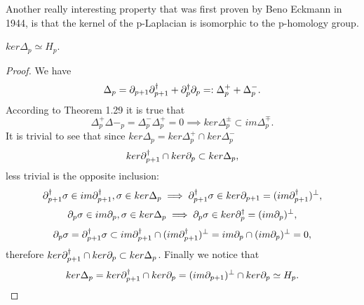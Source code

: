 \documentclass[../1.tex]{subfiles}
\begin{document}
    Another really interesting property that was first proven by Beno Eckmann in 1944, is that the kernel of the p-Laplacian
    is isomorphic to the p-homology group.

    \begin{thm}
        $ker\Delta_p \simeq H_p$.
    \end{thm}
    \begin{proof}
        We have \[ \Delta_p = \partial_{p+1}\partial^\dagger_{p+1} + \partial^\dagger_p\partial_p =: \Delta^+_p + \Delta^-_p.\]
        According to Theorem 1.29 it is true that
        \[  \Delta^+_p\Delta-_p = \Delta^-_p\Delta^+_p = 0\implies ker\Delta^{\pm}_p \subset im\Delta^{\mp}_p.\]
        It is trivial to see that since $ker\Delta_p = ker\Delta^+_p \cap ker\Delta^-_p $
        \[ ker\partial^\dagger_{p+1} \cap ker\partial_p \subset ker\Delta_p,\] less trivial is the opposite inclusion:
        \[ \partial^\dagger_{p+1}\sigma \in im\partial^\dagger_{p+1},\sigma \in ker\Delta_p \implies \partial^\dagger_{p+1}\sigma \in ker\partial_{p+1} = (im\partial^\dagger_{p+1})^\perp,\]
        \[ \partial_p\sigma \in im\partial_p,\sigma \in ker\Delta_p \implies \partial_p\sigma \in ker\partial^\dagger_p= (im\partial_p)^\perp,\]
        \[ \partial_p\sigma = \partial^\dagger_{p+1}\sigma \subset im\partial^\dagger_{p+1} \cap (im\partial^\dagger_{p+1})^\perp = im\partial_p \cap (im\partial_p)^\perp = 0,\]
        therefore $ker\partial^\dagger_{p+1} \cap ker\partial_p \subset ker\Delta_p$. Finally we notice that
        \[ ker\Delta_p = ker\partial^\dagger_{p+1} \cap ker\partial_p = (im\partial_{p+1})^\perp \cap ker\partial_p \simeq H_p.\]
    \end{proof}
\end{document}
